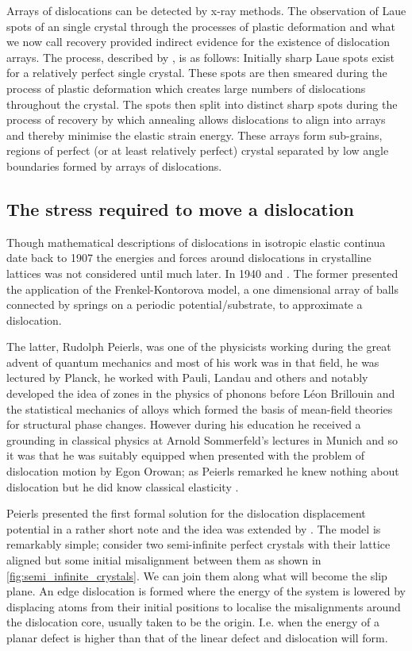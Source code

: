 Arrays of dislocations can be detected by x-ray methods. The observation of Laue spots of an single crystal through the processes of plastic deformation and what we now call recovery provided indirect evidence for the existence of dislocation arrays. The process, described by \citet{Cottrell1949}, is as follows: Initially sharp Laue spots exist for a relatively perfect single crystal. These spots are then smeared during the process of plastic deformation which creates large numbers of dislocations throughout the crystal. The spots then split into distinct sharp spots during the process of recovery by which annealing allows dislocations to align into arrays and thereby minimise the elastic strain energy. These arrays form sub-grains, regions of perfect (or at least relatively perfect) crystal separated by low angle boundaries formed by arrays of dislocations.


\subsection{The stress required to move a dislocation}

Though mathematical descriptions of dislocations in isotropic elastic continua date back to 1907 \cite{Volterra1907} the energies and forces around dislocations in crystalline lattices was not considered until much later. In 1940 \citet{Dehlinger1940} and \citet{Peierls1940}. The former presented the application of the Frenkel-Kontorova model, a one dimensional array of balls connected by springs on a periodic potential/substrate, to approximate a dislocation.

The latter, Rudolph Peierls, was one of the physicists working during the great advent of quantum mechanics and most of his work was in that field, he was lectured by Planck, he worked with Pauli, Landau and others and
notably developed the idea of zones in the physics of phonons before Léon Brillouin and the statistical mechanics of alloys which formed the basis of mean-field theories for structural phase changes.
However during his education he received a grounding in classical physics at Arnold Sommerfeld's lectures in Munich and so it was that he was suitably equipped when presented with the problem of dislocation motion by Egon Orowan; as Peierls remarked he knew nothing about dislocation but he did know classical elasticity \cite{Edwards1996}.


Peierls presented the first formal solution for the dislocation displacement potential in a rather short note \cite{Peierls1940} and the idea was extended by \citet{Nabarro1947}. The model is remarkably simple; consider two semi-infinite perfect crystals with their lattice aligned but some initial misalignment between them as shown in \autoref{fig:semi_infinite_crystals}. We can join them along what will become the slip plane. An edge dislocation is formed where the energy of the system is lowered by displacing atoms from their initial positions to localise the misalignments around the dislocation core, usually taken to be the origin. I.e. when the energy of a planar defect is higher than that of the linear defect and dislocation will form.


